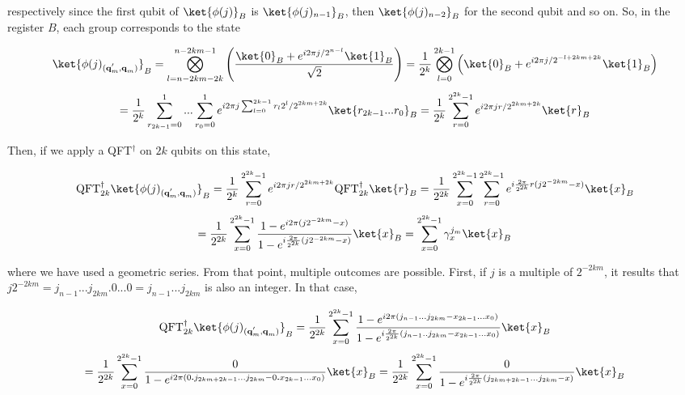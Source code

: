 respectively since the first qubit of $\ket{\phi(j)}_B$ is $\ket{\phi(j)_{n-1}}_B$, then $\ket{\phi(j)_{n-2}}_B$ for the second qubit and so on. So, in the register $B$, each group corresponds to the state 

\begin{equation*}
    \ket{\phi(j)_{(\textbf{q}^{'}_m, \textbf{q}_{m})}}_{B} = \bigotimes_{l=n-2km-2k}^{n-2km-1}\left(\frac{\ket{0}_B+e^{i2\pi j/2^{n-l}}\ket{1}_B}{\sqrt{2}}\right) = \frac{1}{2^k}\bigotimes_{l=0}^{2k-1}\left(\ket{0}_B + e^{i2\pi j/2^{-l+2km+2k}}\ket{1}_B\right)
\end{equation*}
\begin{equation*}
    = \frac{1}{2^k}\sum_{r_{2k-1}=0}^{1}...\sum_{r_0=0}^{1}e^{i2\pi j \sum_{l=0}^{2k-1}r_l2^l / 2^{2km+2k}}\ket{r_{2k-1}...r_0}_B = \frac{1}{2^k}\sum_{r=0}^{2^{2k}-1}e^{i2\pi jr/2^{2km+2k}} \ket{r}_B
\end{equation*}

Then, if we apply a QFT$^{\dagger}$ on $2k$ qubits on this state,

\begin{equation*}
    \text{QFT}^{\dagger}_{2k}\ket{\phi(j)_{(\textbf{q}^{'}_m, \textbf{q}_{m})}}_{B} = \frac{1}{2^k}\sum_{r=0}^{2^{2k}-1}e^{i2\pi jr/2^{2km+2k}} \text{QFT}^\dagger_{2k}\ket{r}_B = \frac{1}{2^{2k}}\sum_{x=0}^{2^{2k}-1}\sum_{r=0}^{2^{2k}-1}e^{i\frac{2\pi}{2^{2k}}r(j2^{-2km}-x)}\ket{x}_B
\end{equation*}
\begin{equation}
    = \frac{1}{2^{2k}}\sum_{x=0}^{2^{2k}-1}\frac{1 - e^{i 2\pi(j2^{-2km}-x)}}{1 - e^{i \frac{2\pi}{2^{2k}}(j2^{-2km}-x)}}\ket{x}_B = \sum_{x=0}^{2^{2k}-1}\gamma_x^{j_m}\ket{x}_B
    \label{qft_dag_fpe}
\end{equation}

where we have used a geometric series. From that point, multiple outcomes are possible. First, if $j$ is a multiple of $2^{-2km}$, it results that $j2^{-2km} = j_{n-1}...j_{2km}\textbf{.}0...0 = j_{n-1}...j_{2km}$ is also an integer. In that case,

\begin{equation*}
    \text{QFT}^{\dagger}_{2k}\ket{\phi(j)_{(\textbf{q}^{'}_m, \textbf{q}_{m})}}_{B} = \frac{1}{2^{2k}}\sum_{x=0}^{2^{2k}-1}\frac{1 - e^{i2\pi(j_{n-1}...j_{2km} - x_{2k-1}...x_0)}}{1-e^{i\frac{2\pi}{2^{2k}}(j_{n-1}..j_{2km}-x_{2k-1}...x_0)}} \ket{x}_B
\end{equation*}
\begin{equation*}
    = \frac{1}{2^{2k}}\sum_{x=0}^{2^{2k}-1}\frac{0}{1-e^{i2\pi(0\textbf{.}j_{2km+2k-1}...j_{2km} - 0\textbf{.}x_{2k-1}...x_0)}} \ket{x}_B = \frac{1}{2^{2k}}\sum_{x=0}^{2^{2k}-1}\frac{0}{1-e^{i\frac{2\pi}{2^{2k}}(j_{2km+2k-1}...j_{2km}-x)}}\ket{x}_B
\end{equation*}

